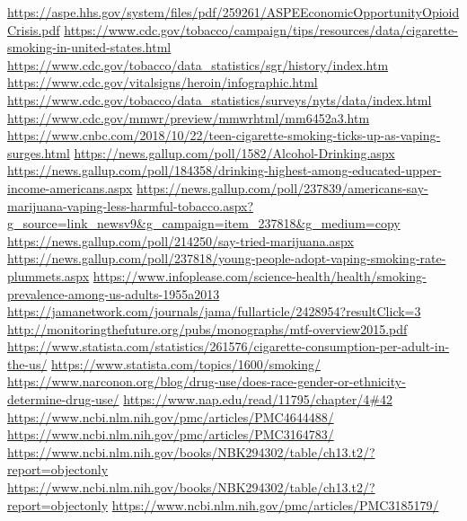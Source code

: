 \documentclass{article}
\begin{document}
\newpage

\begin{thebibliography}{1}
\url{https://aspe.hhs.gov/system/files/pdf/259261/ASPEEconomicOpportunityOpioidCrisis.pdf}
\url{https://www.cdc.gov/tobacco/campaign/tips/resources/data/cigarette-smoking-in-united-states.html}
\url{https://www.cdc.gov/tobacco/data\_statistics/sgr/history/index.htm}
\url{https://www.cdc.gov/vitalsigns/heroin/infographic.html}
\url{https://www.cdc.gov/tobacco/data\_statistics/surveys/nyts/data/index.html}
\url{https://www.cdc.gov/mmwr/preview/mmwrhtml/mm6452a3.htm}
\url{https://www.cnbc.com/2018/10/22/teen-cigarette-smoking-ticks-up-as-vaping-surges.html}
\url{https://news.gallup.com/poll/1582/Alcohol-Drinking.aspx}
\url{https://news.gallup.com/poll/184358/drinking-highest-among-educated-upper-income-americans.aspx}
\url{https://news.gallup.com/poll/237839/americans-say-marijuana-vaping-less-harmful-tobacco.aspx?g\_source=link\_newsv9&g\_campaign=item\_237818&g\_medium=copy}
\url{https://news.gallup.com/poll/214250/say-tried-marijuana.aspx}
\url{https://news.gallup.com/poll/237818/young-people-adopt-vaping-smoking-rate-plummets.aspx}
\url{https://www.infoplease.com/science-health/health/smoking-prevalence-among-us-adults-1955a2013}
\url{https://jamanetwork.com/journals/jama/fullarticle/2428954?resultClick=3}
\url{http://monitoringthefuture.org/pubs/monographs/mtf-overview2015.pdf}
\url{https://www.statista.com/statistics/261576/cigarette-consumption-per-adult-in-the-us/}
\url{https://www.statista.com/topics/1600/smoking/}
\url{https://www.narconon.org/blog/drug-use/does-race-gender-or-ethnicity-determine-drug-use/}
\url{https://www.nap.edu/read/11795/chapter/4\#42}
\url{https://www.ncbi.nlm.nih.gov/pmc/articles/PMC4644488/}
\url{https://www.ncbi.nlm.nih.gov/pmc/articles/PMC3164783/}
\url{https://www.ncbi.nlm.nih.gov/books/NBK294302/table/ch13.t2/?report=objectonly}
\url{https://www.ncbi.nlm.nih.gov/books/NBK294302/table/ch13.t2/?report=objectonly}
\url{https://www.ncbi.nlm.nih.gov/pmc/articles/PMC3185179/}

\end{thebibliography}
\end{document}
